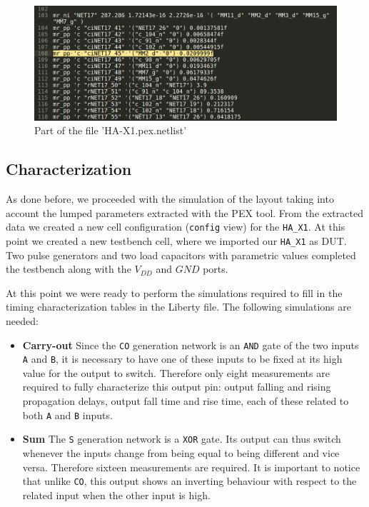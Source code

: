 \documentclass[a4paper]{article}
\newcommand{\ha}{\texttt{HA\_X1}\xspace}
\begin{document}
\begin{figure}[H]
      \centering
       \includegraphics[width=12cm]{./Images/HA/HAX1_PEX_netlist.png}
\caption{Part of the file 'HA-X1.pex.netlist'}
\label{fig: PEX0_netlist}
\end{figure}


\subsection{Characterization}
As done before, we proceeded with the simulation of the layout taking into account the lumped parameters extracted with the PEX tool. From the extracted data we created a new cell configuration (\texttt{config} view) for the \ha. At this point we created a new testbench cell, where we imported our \ha as DUT. Two pulse generators and two load capacitors with parametric values completed the testbench along with the $V_{DD}$ and $GND$ ports.

At this point we were ready to perform the simulations required to fill in the timing characterization tables in the Liberty file. The following simulations are needed:
\begin{itemize}
	\item \textbf{Carry-out} Since the \texttt{CO} generation network is an \texttt{AND} gate of the two inputs \texttt{A} and \texttt{B}, it is necessary to have one of these inputs to be fixed at its high value for the output to switch. Therefore only eight measurements are required to fully characterize this output pin: output falling and rising propagation delays, output fall time and rise time, each of these related to both \texttt{A} and \texttt{B} inputs.

	\item \textbf{Sum} The \texttt{S} generation network is a \texttt{XOR} gate. Its output can thus switch whenever the inputs change from being equal to being different and vice versa. Therefore sixteen measurements are required. It is important to notice that unlike \texttt{CO}, this output shows an inverting behaviour with respect to the related input when the other input is high.
\end{itemize}
\end{document}
